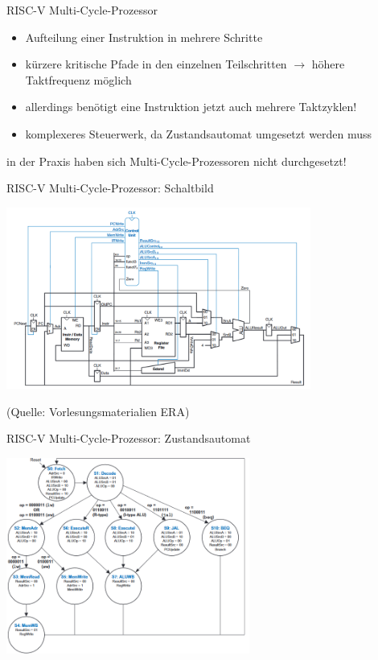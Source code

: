 \documentclass[
  german,            %
  aspectratio=169,    %
]{tumbeamer}
\begin{document}
\begin{frame}[c, fragile]{RISC-V Multi-Cycle-Prozessor}{}
	\begin{itemize}
		\item Aufteilung einer Instruktion in mehrere Schritte
		\item kürzere kritische Pfade in den einzelnen Teilschritten $\rightarrow$ höhere Taktfrequenz möglich
		\item allerdings benötigt eine Instruktion jetzt auch mehrere Taktzyklen!
		\item komplexeres Steuerwerk, da Zustandsautomat umgesetzt werden muss
	\end{itemize}
\begin{center}
			in der Praxis haben sich Multi-Cycle-Prozessoren nicht durchgesetzt!
\end{center}
\end{frame}

\begin{frame}[c]{RISC-V Multi-Cycle-Prozessor: Schaltbild}{}
	\begin{center}
		\includegraphics[width=0.75\textwidth]{w09_multicycle.png}
	\end{center}
	\centering
	\tiny (Quelle: Vorlesungsmaterialien ERA)
\end{frame}

\begin{frame}[c]{RISC-V Multi-Cycle-Prozessor: Zustandsautomat}{}
	\begin{center}
		\includegraphics[width=0.6\textwidth]{w09_multicycle_states.png}
	\end{center}
	\centering
\end{frame}
\end{document}
